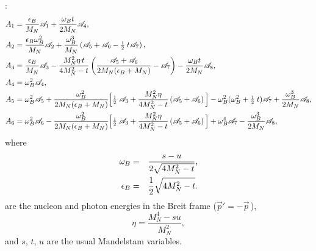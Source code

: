 \documentclass[preprints,review,accept,moreauthors,pdftex]{Definitions/mdpi}
\def\beq{\begin{equation}}
\def\eeq{\end{equation}}
\def\bea{\begin{eqnarray}}
\def\eea{\end{eqnarray}}
\def\eqlab#1{\label{eq:#1}}
\def\w{\omega} \def\W{\Omega} \def\hw{\hat{\omega}}
\def\scA{\mathscr{A}}
\def\half{\mbox{\small{$\frac{1}{2}\;$}}}
\begin{document}
\cite{McGovern:2012ew}: 
\beq
\begin{aligned}
\eqlab{eq:relations_Ai_covarAi}
A_1& = \frac{\eps_B}{M_N} \scA_1 + \frac{\omega_B t }{2 M_N} \scA_4, \\
A_2 &= \frac{\eps_B \w_B^2 }{M_N} \scA_2 + \frac{\omega_B^3}{M_N} \left(
\scA_5 + \scA_6  -  \half t \scA_7 \right),  \\
A_3 &=  \frac{\eps_B }{M_N} \scA_3 - \frac{M_N^2 \eta\, t}{4M_N^2-t} 
\left(\frac{\scA_5 + \scA_6 }{2M_N(\eps_B +M_N)} - \scA_7\right) - 
\frac{\omega_B t }{2 M_N} \scA_8, \\
A_4 &= \w_B^2 \scA_4, \\
A_5 &= \w_B^2 \scA_5 +  \frac{\w_B^2}{2M_N (\eps_B + M_N)} \Big[\half \scA_3 
+ \frac{M_N^2\eta}{4M_N^2-t}  \left(\scA_5 + \scA_6 \right) \Big] 
-\w_B^2 (\omega_B^2 + \half t) \scA_7 + \frac{\omega_B^3}{2 M_N} \scA_8,  \\
A_6 &= \w_B^2 \scA_6 -  \frac{\w_B^2}{2M_N (\eps_B + M_N)} \Big[\half \scA_3 
+ \frac{M_N^2\eta}{4M_N^2-t}  \left(\scA_5 + \scA_6 \right) \Big] + \omega_B^4 \scA_7 - \frac{\omega_B^3}{2 M_N} \scA_8, 
\end{aligned}
\eeq
where 
\bea
\w_B &=& \frac{s-u}{2\sqrt{4M_N^2 -  t}},\\
\eps_B &=& \frac12 \sqrt{4M_N^2 -  t}.
\eea
are the nucleon and photon energies in the 
Breit frame ($\vec{p}'=-\vec{p}\,$),  
\beq
\eta=\frac{M_N^4-su}{M_N^2},
\eeq
and $s$, $t$, $u$ are the usual Mandelstam variables. 
\end{document}
